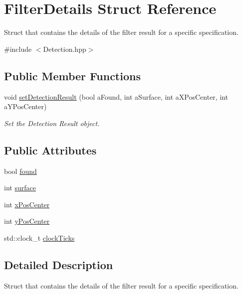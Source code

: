 \hypertarget{structFilterDetails}{}\section{Filter\+Details Struct Reference}
\label{structFilterDetails}


Struct that contains the details of the filter result for a specific specification.  




{\ttfamily \#include $<$Detection.\+hpp$>$}

\subsection*{Public Member Functions}
\begin{DoxyCompactItemize}
\item 
void \hyperlink{structFilterDetails_a54e86f6b64249a9aee7f8d6f39f51939}{set\+Detection\+Result} (bool a\+Found, int a\+Surface, int a\+X\+Pos\+Center, int a\+Y\+Pos\+Center)
\begin{DoxyCompactList}\small\item\em Set the Detection Result object. \end{DoxyCompactList}\end{DoxyCompactItemize}
\subsection*{Public Attributes}
\begin{DoxyCompactItemize}
\item 
bool \hyperlink{structFilterDetails_ae022d744143354507ecb4a46c4c4dcf4}{found}
\item 
int \hyperlink{structFilterDetails_ae5c1354aeca0877f498f6e05853aedf4}{surface}
\item 
int \hyperlink{structFilterDetails_a93a398ce2876fd270232559ab29b79ce}{x\+Pos\+Center}
\item 
int \hyperlink{structFilterDetails_a68c1cab0adbbfb1ffff14518fdc2295e}{y\+Pos\+Center}
\item 
std\+::clock\+\_\+t \hyperlink{structFilterDetails_ac2d190dc9427d80070ac50ce8c703d43}{clock\+Ticks}
\end{DoxyCompactItemize}


\subsection{Detailed Description}
Struct that contains the details of the filter result for a specific specification. 

